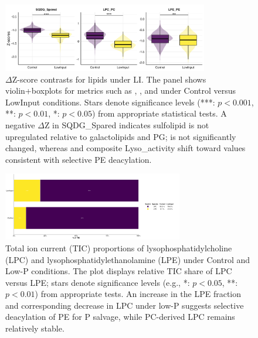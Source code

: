 \documentclass[10pt,letterpaper]{article}
\begin{document}
\begin{figure}[htp]
  \centering
  \includegraphics[width=0.8\textwidth]{fig/supp/SuppFig_4_lipid_ratio_linear_lowP.png}
  \caption{$\Delta$Z-score contrasts for lipids under LI. 
    The panel shows violin+boxplots for metrics such as , , and  under Control versus LowInput conditions. 
    Stars denote significance levels (***: $p<0.001$, **: $p<0.01$, *: $p<0.05$) from appropriate statistical tests. 
    A negative $\Delta$Z in SQDG\_Spared indicates sulfolipid is not upregulated relative to galactolipids and PG; 
     is not significantly changed, whereas  and composite Lyso\_activity shift toward values consistent with selective PE deacylation.}
  \label{fig:S4_lipid_ratio_lowP}
\end{figure}

\begin{figure}[htp]
  \centering
  \includegraphics[width=0.7\textwidth]{fig/supp/SuppFig_5_TIC_LPC_LPE.png}
  \caption{Total ion current (TIC) proportions of lysophosphatidylcholine (LPC) and lysophosphatidylethanolamine (LPE) under Control and Low-P conditions. The plot displays relative TIC share of LPC versus LPE; stars denote significance levels (e.g., *: $p<0.05$, **: $p<0.01$) from appropriate tests. An increase in the LPE fraction and corresponding decrease in LPC under low-P suggests selective deacylation of PE for P salvage, while PC-derived LPC remains relatively stable.}
  \label{fig:S5_TIC_LPC_LPE}
\end{figure}
\end{document}
